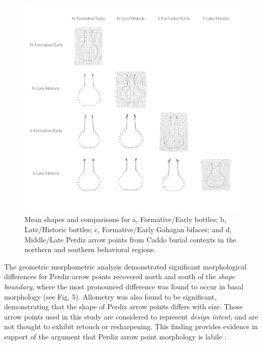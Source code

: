\documentclass[smallextended]{svjour3}       %
\begin{document}
\begin{figure}
\includegraphics[width=1\linewidth]{ms-figs/figure6} \caption{Mean shapes and comparisons for a, Formative/Early bottles; b, Late/Historic bottles; c, Formative/Early Gahagan bifaces; and d, Middle/Late Perdiz arrow points from Caddo burial contexts in the northern and southern behavioral regions.}\label{fig:fig5}
\end{figure}

The geometric morphometric analysis demonstrated significant
morphological differences for Perdiz arrow points recovered north and
south of the \emph{shape boundary}, where the most pronounced difference
was found to occur in basal morphology (see Fig. 5). Allometry was also
found to be significant, demonstrating that the shape of Perdiz arrow
points differs with size. Those arrow points used in this study are
considered to represent \emph{design intent}, and are not thought to
exhibit retouch or resharpening. This finding provides evidence in
support of the argument that Perdiz arrow point morphology is labile
\cite{RN9364}.
\end{document}
